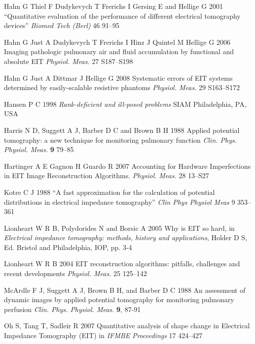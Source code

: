 \documentclass[12pt]{iopart}
\begin{document}
\item[]
Hahn G Thiel F Dudykevych T Frerichs I Gersing E
and Hellige G 2001
``Quantitative evaluation of the performance of
different electrical tomography devices''
{\em  Biomed Tech (Berl)}
46 91--95

\item[]
Hahn G Just A Dudykevych T Frerichs I Hinz J  Quintel M Hellige G
2006
Imaging pathologic pulmonary air and fluid accumulation by
 functional and absolute EIT
{\em Physiol. Meas.}
27 S187--S198

\item[]
Hahn G Just A Dittmar J  Hellige G 2008
Systematic errors of EIT systems determined by easily-scalable
 resistive phantoms
{\em Physiol. Meas.}
 29 S163--S172


\item[]
Hansen P C 1998 {\em Rank-deficient and ill-posed problems}
SIAM Philadelphia, PA, USA

\item[]
Harris N D, Suggett A J, Barber D C and Brown B H 1988 Applied
potential tomography: a new technique for monitoring pulmonary
function {\em Clin. Phys. Physiol. Meas.} {\bf 9} 79--85

\item[]
Hartinger A E Gagnon H Guardo R 2007
Accounting for Hardware Imperfections in EIT Image
Reconstruction Algorithms.
{\em Physiol. Meas.}
28 13--S27
 
\item[]
Kotre C J 1988
``A fast approximation for the calculation of potential distributions in electrical impedance tomography''
{\em Clin Phys Physiol Meas}
9 353--361

\item[]
Lionheart W R B, Polydorides N and Borsic A 2005 Why is EIT so hard,
in {\em Electrical impedance tomography: methods, history and
applications}, Holder D S, Ed. Bristol and Philadelphia, IOP, pp.
3-4

\item[]
Lionheart W R B 2004
EIT reconstruction algorithms: pitfalls, challenges
and recent developments
{\em Physiol. Meas.}
25 125--142

\item[]
McArdle F J, Suggett A J, Brown B H, and Barber D C 1988 An
assessment of dynamic images by applied potential tomography for
monitoring pulmonary perfusion {\em Clin. Phys. Physiol. Meas.}
{\bf 9}, 87-91

\item[]
Oh S, Tang T, Sadleir R 2007
Quantitative analysis of shape change in Electrical Impedance Tomography (EIT)
in {\em IFMBE Proceedings}
17 424--427
\end{document}

